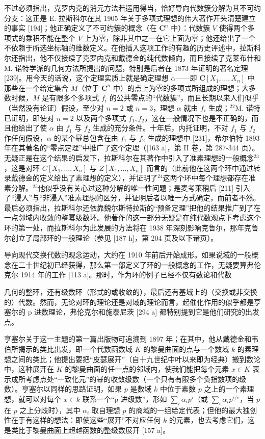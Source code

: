 不过必须指出，克罗内克的消元方法若运用得当，恰好导向代数簇分解为其不可约分支：这正是 E. 拉斯科尔在其 1905 年关于多项式理想的伟大著作开头清楚建立的事实 {[}194{]}；他正确定义了不可约簇的概念（在 \(\mathbf{C}^n\) 中）：代数簇 \(V\) 使得两个多项式的乘积不能在整个 \(V\) 上为零，除非其中之一在它上面为零；他还给出了一个不依赖于所选坐标轴的维数定义。在他插入这项工作的有趣的历史评述中，拉斯科尔还指出，他不仅接续了克罗内克和戴德金的纯代数倾向，而且接续了克莱布什和 M. 诺特学派的几何方法所提出的问题，特别是后者在 1873 年证明的著名定理 {[}239{]}。用今天的话说，这个定理实质上就是确定理想 \(\alpha\)——即 \(\mathbf{C}[X_1,\ldots ,X_n]\) 中那些在一个给定集合 \(M\)（位于 \(\mathbf{C}^n\) 中）的点上为零的多项式所组成的理想；大多数时候，\(M\) 是有限多个多项式 \(f_{i}\) 的公共零点的“代数簇”，而且长期以来人们似乎（当然没有论证）假设，至少对 \(n = 2\) 或 \(n = 3\)，理想 \(\alpha\) 就由 \(f_{i}\) 生成；\(^{22}\)M. 诺特已证明，即使对 \(n = 2\) 以及两个多项式 \(f_{1},f_{2}\)，这在一般情况下也是不正确的，而且他给出了使 \(\alpha\) 由 \(f_{1}\) 与 \(f_{2}\) 生成的充分条件。十年后，内托证明，不对 \(f_{1}\) 与 \(f_{2}\) 作任何假设，\(\alpha\) 的某个幂总包含在由 \(f_{1}\) 与 \(f_{2}\) 生成的理想中 {[}231{]}，希尔伯特 1893 年在其著名的“零点定理”中推广了这个定理（{[}163 a{]}，第 II 卷，第 287-344 页）。无疑正是在这个结果的启发下，拉斯科尔在其著作中引入了准素理想的一般概念\(^{23}\)，这是对环 \(C[X_{1},\ldots,X_{n}]\) 与 \(Z[X_{1},\ldots,X_{n}]\) 而言的（此前他在这两个环中通过转录戴德金的定义给出了素理想的定义），并证明了\(^{24}\)这两个环中每个理想都存在准素分解。\(^{25}\)他似乎没有关心过这种分解的唯一性问题；是麦考莱稍后 {[}211{]} 引入了“浸入”与“非浸入”准素理想的区分，并证明后者以唯一方式确定，而前者不然。最后必须指出，拉斯科尔还依靠魏尔斯特拉斯的“预备定理”把他的结果推广到了在一点邻域内收敛的整幂级数环。他著作的这一部分无疑是在纯代数观点下考虑这个环的第一处，而拉斯科尔为此发展的方法将在 1938 年深刻影响克鲁尔，那年克鲁尔创立了局部环的一般理论（参见 {[}187 h{]}，第 204 页及以下诸页）。

导向现代交换代数的观念运动，大约在 1910 年前后开始成形。如果说域的一般概念在二十世纪初已经获得，那么第一部定义了环的一般概念的工作，无疑要算弗伦克尔 1914 年的工作 {[}113 a{]}。那时，作为环的例子已经不仅有数论和代数

几何的整环，还有级数环（形式的或收敛的），最后还有基域上的（交换或非交换的）代数。然而，无论对环的理论还是对域的理论而言，起催化作用的似乎都是亨塞尔的 p 进数理论，弗伦克尔和施泰尼茨 {[}294 a{]} 都特别提到它是他们研究的出发点。

亨塞尔关于这一主题的第一篇出版物可追溯到 1897 年；在其中，他从戴德金和韦伯所揭示的类比出发，即一个代数函数域 \(K\) 的黎曼曲面的点与一个数域 \(k\) 的素理想之间的类比；他提出要把“皮瑟展开”（自十九世纪中叶以来即为经典）搬到数论中，这种展开在 \(K\) 的黎曼曲面的任一点的邻域内，使我们能把每个元素 \(x \in K\) 表示成所考虑点处“一致化元”的幂的收敛级数（一个只有有限多个负指数项的级数）。亨塞尔以同样的思路证明，如果 \(p\) 是数域 \(k\) 中位于素数 \(p\) 之上的一个素理想，就可以对每个 \(x \in k\) 联系一个“p 进级数”，形如 \(\sum_{i} \alpha_{i} p^{i}\)（或 \(\sum_{i} \alpha_{i} p^{i/e}\)，当 \(p\) 在 \(p\) 之上分歧时），其中 \(\alpha_{i}\) 取自理想 \(p\) 的商域的一组给定代表；但他的最大独创性在于有这样的想法：即使这些“展开”不对应任何 \(k\) 的元素，也去考虑它们，这是类比于黎曼曲面上超越函数的整级数展开 {[}157 a{]}。

